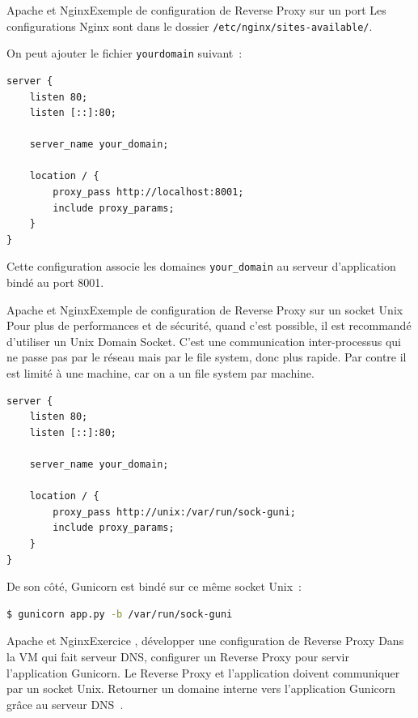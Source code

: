 \documentclass{beamer}
\begin{document}
    \begin{frame}[fragile]{Apache et Nginx}{Exemple de configuration de Reverse Proxy sur un port}
        Les configurations Nginx sont dans le dossier \lstinline{/etc/nginx/sites-available/}.

        On peut ajouter le fichier \lstinline{yourdomain} suivant~:
        \begin{lstlisting}
server {
    listen 80;
    listen [::]:80;

    server_name your_domain;

    location / {
        proxy_pass http://localhost:8001;
        include proxy_params;
    }
}
        \end{lstlisting}
        Cette configuration associe les domaines \lstinline{your_domain} au serveur d'application bindé au port 8001.
    \end{frame}

    \begin{frame}[fragile]{Apache et Nginx}{Exemple de configuration de Reverse Proxy sur un socket Unix}
        Pour plus de performances et de sécurité, quand c'est possible, il est recommandé d'utiliser un Unix Domain Socket.
        C'est une communication inter-processus qui ne passe pas par le réseau mais par le file system, donc plus rapide.
        Par contre il est limité à une machine, car on a un file system par machine.
        \begin{lstlisting}
server {
    listen 80;
    listen [::]:80;

    server_name your_domain;

    location / {
        proxy_pass http://unix:/var/run/sock-guni;
        include proxy_params;
    }
}
        \end{lstlisting}
        De son côté, Gunicorn est bindé sur ce même socket Unix~:
        \begin{lstlisting}[language=bash]
$ gunicorn app.py -b /var/run/sock-guni
        \end{lstlisting}
    \end{frame}

    \begin{frame}{Apache et Nginx}{Exercice \execcounterdispinc{}, développer une configuration de Reverse Proxy}
        Dans la VM qui fait serveur DNS, configurer un Reverse Proxy pour servir l'application Gunicorn.
        Le Reverse Proxy et l'application doivent communiquer par un socket Unix.
        Retourner un domaine interne vers l'application Gunicorn grâce au serveur DNS~.
    \end{frame}
\end{document}
